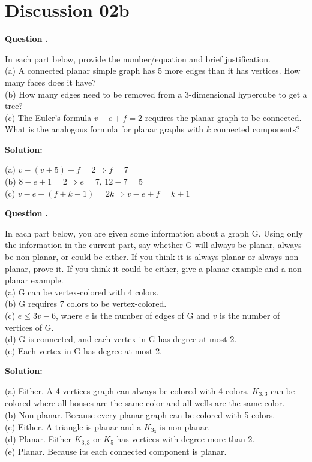 \documentclass[12pt]{article}
\newcounter{questionnumber}
\newenvironment{question}[1][]{\stepcounter{questionnumber}\par\noindent\textbf{Question \thequestionnumber. #1}\par}{\par}
\newenvironment{solution}{\par\noindent\textbf{Solution:}\par}{\par\vspace{1em}}
\begin{document}
\section{Discussion 02b}
\begin{question}
    In each part below, provide the number/equation and brief justification.\\
    (a) A connected planar simple graph has 5 more edges than it has vertices. How many faces does it have?\\
    (b) How many edges need to be removed from a 3-dimensional hypercube to get a tree?\\
    (c) The Euler's formula $v - e + f = 2$ requires the planar graph to be connected. What is the analogous formula for planar graphs with $k$ connected components?
\end{question}
\begin{solution}
    \noindent
    (a) $v-\left( v+5 \right) +f=2\Longrightarrow f=7$\\
    (b) $8-e+1=2\Longrightarrow e=7$, $12-7=5$\\
    (c) $v-e+\left( f+k-1 \right) =2k\Longrightarrow v-e+f=k+1$
\end{solution}
\begin{question}
In each part below, you are given some information about a graph G. Using only the information in the current part, say whether G will always be planar, always be non-planar, or could be either. If you think it is always planar or always non-planar, prove it. If you think it could be either, give a planar example and a non-planar example.\\
(a) G can be vertex-colored with 4 colors.\\
(b) G requires 7 colors to be vertex-colored.\\
(c) $e \leq 3v - 6$, where $e$ is the number of edges of G and $v$ is the number of vertices of G.\\
(d) G is connected, and each vertex in G has degree at most 2.\\
(e) Each vertex in G has degree at most 2.
\end{question}
\begin{solution}
    \noindent    
    (a) Either. A 4-vertices graph can always be colored with 4 colors. $K_{3,3}$ can be colored where all houses are the same color and all wells are the same color. \\
    (b) Non-planar. Because every planar graph can be colored with 5 colors.\\
    (c) Either. A triangle is planar and a $K_{3_3}$ is non-planar.\\
    (d) Planar. Either $K_{3,3}$ or $K_5$ has vertices with degree more than 2.\\
    (e) Planar. Because its each connected component is planar.
\end{solution}
\end{document}

